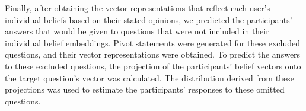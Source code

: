 Finally, after obtaining the vector representations that reflect each user's individual beliefs based on their stated opinions, we predicted the participants' answers that would be given to questions that were not included in their individual belief embeddings. Pivot statements were generated for these excluded questions, and their vector representations were obtained. To predict the answers to these excluded questions, the projection of the participants' belief vectors onto the target question's vector was calculated. The distribution derived from these projections was used to estimate the participants' responses to these omitted questions. 
